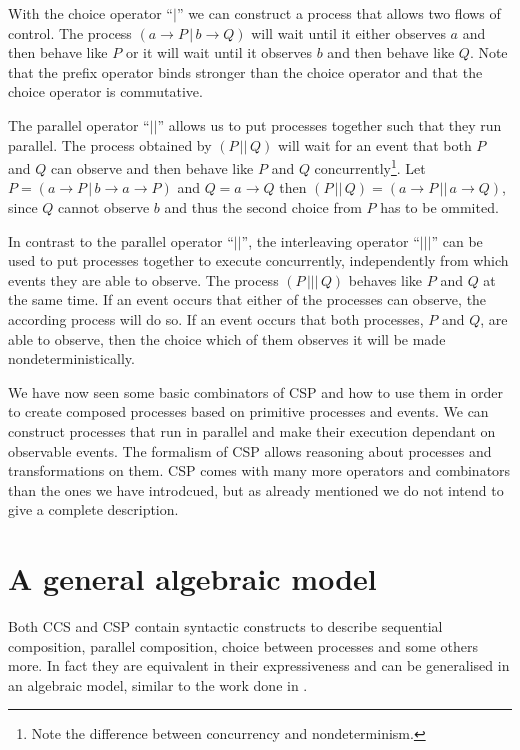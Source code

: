 With the choice operator \enquote{$|$} we can construct a process that allows two flows of control. The process $\left( a \to P \,|\, b \to Q \right)$ will wait until it either observes $a$ and then behave like $P$ or it will wait until it observes $b$ and then behave like $Q$. Note that the prefix operator binds stronger than the choice operator and that the choice operator is commutative.

The parallel operator \enquote{$||$} allows us to put processes together such that they run parallel. The process obtained by $\left( P \,||\, Q \right)$ will wait for an event that both $P$ and $Q$ can observe and then behave like $P$ and $Q$ concurrently\footnote{Note the difference between concurrency and nondeterminism.}. Let $P = \left( a \to P \,|\, b \to a \to P \right)$ and $Q = a \to Q$ then $\left( P \,||\, Q \right) = \left( a \to P \,||\, a \to Q \right)$, since $Q$ cannot observe $b$ and thus the second choice from $P$ has to be ommited.

In contrast to the parallel operator \enquote{$||$}, the interleaving operator \enquote{$|||$} can be used to put processes together to execute concurrently, independently from which events they are able to observe. The process $\left( P \,|||\, Q \right)$ behaves like $P$ and $Q$ at the same time. If an event occurs that either of the processes can observe, the according process will do so. If an event occurs that both processes, $P$ and $Q$, are able to observe, then the choice which of them observes it will be made nondeterministically.

We have now seen some basic combinators of \textsc{CSP} and how to use them in order to create composed processes based on primitive processes and events. We can construct processes that run in parallel and make their execution dependant on observable events. The formalism of \textsc{CSP} allows reasoning about processes and transformations on them. \textsc{CSP} comes with many more operators and combinators than the ones we have introdcued, but as already mentioned we do not intend to give a complete description.


\section{A general algebraic model}
Both \textsc{CCS} and \textsc{CSP} contain syntactic constructs to describe sequential composition, parallel composition, choice between processes and some others more. In fact they are equivalent in their expressiveness \cite{} and can be generalised in an algebraic model, similar to the work done in \cite{Hoare:2012:LPU:2368298.2368301}.

